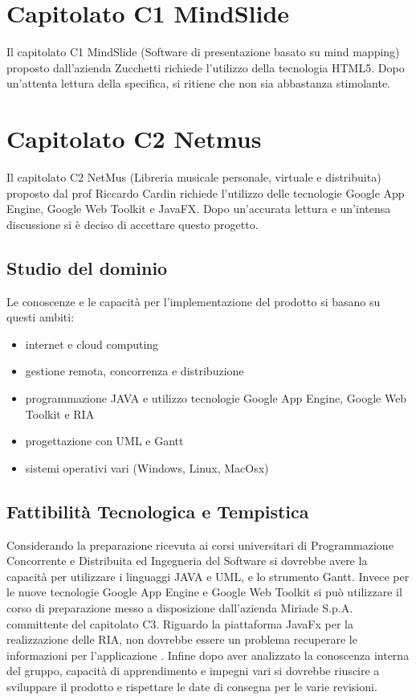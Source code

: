 


\chapter{Capitolato C1 MindSlide}
Il capitolato C1 MindSlide (Software di presentazione basato su mind mapping)
proposto dall'azienda Zucchetti richiede l'utilizzo della tecnologia HTML5. Dopo
un'attenta lettura della specifica, si ritiene che non sia abbastanza stimolante.

\chapter{Capitolato C2 Netmus}
Il capitolato C2 NetMus (Libreria musicale personale, virtuale e distribuita)
proposto dal prof Riccardo Cardin richiede l'utilizzo delle tecnologie Google
App Engine, Google Web Toolkit e JavaFX. Dopo un'accurata lettura e un'intensa
discussione si \`e deciso di accettare questo progetto.
\section{Studio del dominio} 
Le conoscenze e le capacit\`a per l'implementazione del prodotto si basano su
questi ambiti:
\begin{itemize}
  \item internet e cloud computing
  \item gestione remota, concorrenza e distribuzione
  \item programmazione JAVA e utilizzo tecnologie Google App Engine, Google Web
  Toolkit e RIA
  \item progettazione con UML e Gantt
  \item sistemi operativi vari (Windows, Linux, MacOsx)
\end{itemize}

\section{Fattibilit\`a Tecnologica e Tempistica}
Considerando la preparazione ricevuta ai corsi universitari di Programmazione
Concorrente e Distribuita ed Ingegneria del Software si dovrebbe avere la
capacit\`a per utilizzare i linguaggi JAVA e UML, e lo strumento Gantt. Invece
per le nuove tecnologie Google App Engine e Google Web Toolkit si pu\`o utilizzare
il corso di preparazione messo a disposizione dall'azienda Miriade S.p.A.
committente del capitolato C3. Riguardo la piattaforma JavaFx per la realizzazione delle RIA, non dovrebbe essere un problema recuperare le informazioni per l'applicazione . Infine dopo aver analizzato la conoscenza interna del gruppo, capacit\`a di apprendimento e impegni vari si dovrebbe riuscire a sviluppare il prodotto e rispettare le date di consegna per le varie revisioni.
